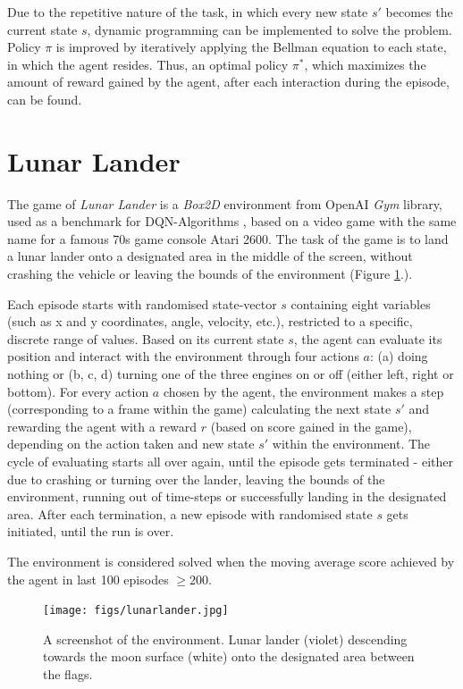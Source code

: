 \documentclass{article}
\begin{document}
Due to the repetitive nature of the task, in which every new state $s'$ becomes the current state $s$, dynamic programming can be implemented to solve the problem. Policy $\pi$ is improved by iteratively applying the Bellman equation to each state, in which the agent resides. Thus, an optimal policy $\pi^*$, which maximizes the amount of reward gained by the agent, after each interaction during the episode, can be found.

\section{Lunar Lander}
The game of \textit{Lunar Lander} is a \textit{Box2D} environment from OpenAI \textit{Gym} library, used as a benchmark for DQN-Algorithms \cite{brockman2016openai}, based on a video game with the same name for a famous 70s game console Atari 2600. The task of the game is to land a lunar lander onto a designated area in the middle of the screen, without crashing the vehicle or leaving the bounds of the environment (Figure \ref{fig:lunarlander}.).

Each episode starts with randomised state-vector $s$ containing eight variables (such as x and y coordinates, angle, velocity, etc.), restricted to a specific, discrete range of values. Based on its current state $s$, the agent can evaluate its position and interact with the environment through four actions $a$: (a) doing nothing or (b, c, d) turning one of the three engines on or off (either left, right or bottom). For every action $a$ chosen by the agent, the environment makes a step (corresponding to a frame within the game) calculating the next state $s'$ and rewarding the agent with a reward $r$ (based on score gained in the game), depending on the action taken and new state $s'$ within the environment. The cycle of evaluating starts all over again, until the episode gets terminated - either due to crashing or turning over the lander, leaving the bounds of the environment, running out of time-steps or successfully landing in the designated area. After each termination, a new episode with randomised state $s$ gets initiated, until the run is over.

The environment is considered solved when the moving average score achieved by the agent in last 100 episodes $\geqslant200$.
\\
\begin{figure}[h]
    \centering
    \texttt{[image: figs/lunarlander.jpg]}
    \caption{A screenshot of the environment. Lunar lander (violet) descending towards the moon surface (white) onto the designated area between the flags.}
    \label{fig:lunarlander}
\end{figure}
\end{document}
